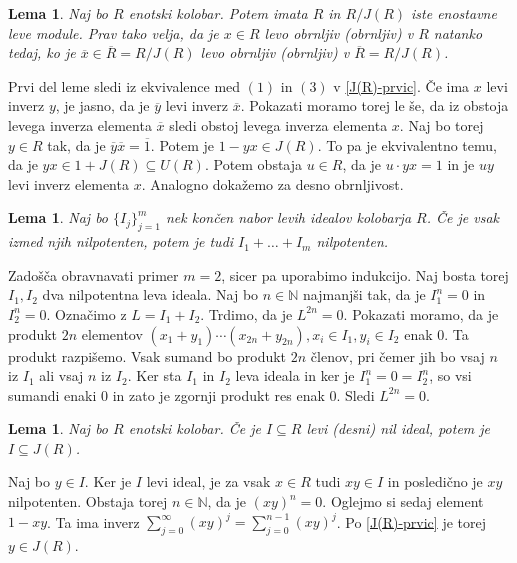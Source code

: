 \documentclass[a4paper, 12pt]{amsart}
\theoremstyle{definition} %
\theoremstyle{plain} %
\newtheorem{lema}[definicija]{Lema}
\newcommand{\N}{\mathbb N}
\begin{document}
\begin{lema}
\label{RinR/J(R)}
Naj bo $R$ enotski kolobar. Potem imata $R$ in $R/J(R)$ iste enostavne leve module. Prav tako velja, da je $x\in R$ levo obrnljiv (obrnljiv) v $R$ natanko tedaj, ko je $\overline{x} \in \overline{R} = R/J(R)$ levo obrnljiv (obrnljiv) v $\overline{R} = R/J(R)$.
\end{lema}

\proof
Prvi del leme sledi iz ekvivalence med $(1)$ in $(3)$ v \ref{J(R)-prvic}. Če ima $x$ levi inverz $y$, je jasno, da je $\overline{y}$ levi inverz $\overline{x}$. Pokazati moramo torej le še, da iz obstoja levega inverza elementa $\overline{x}$ sledi obstoj levega inverza  elementa $x$. Naj bo torej $y\in R$ tak, da je $\overline{y} \overline{x} = \overline{1}$. Potem je $1- yx \in J(R)$. To pa je ekvivalentno temu, da je $yx \in 1 + J(R) \subseteq U(R)$. Potem obstaja  $u\in R$, da je $u\cdot yx =1$ in je $uy $ levi inverz elementa $x$. Analogno dokažemo za desno obrnljivost.
\endproof

\begin{lema}
Naj bo $\{I_j\}_{j=1}^m$ nek končen nabor levih idealov kolobarja $R$. Če je vsak izmed njih nilpotenten, potem je tudi $I_1 + \dots + I_m$ nilpotenten.
\end{lema}

\proof
Zadošča obravnavati primer $m=2$, sicer pa uporabimo indukcijo. Naj bosta torej $I_1,I_2$ dva nilpotentna leva ideala. Naj bo $n\in \N$ najmanjši tak, da je $I_1^n = 0$ in $I_2^n = 0$. Označimo z $L=I_1 + I_2$. Trdimo, da je $L^{2n} = 0$. Pokazati moramo, da je produkt $2n$ elementov $(x_1 + y_1) \cdots (x_{2n} + y_{2n}), x_i \in I_1, y_i \in I_2$  enak 0. Ta produkt razpišemo. Vsak sumand bo produkt $2n$ členov, pri čemer jih bo vsaj $n$ iz $I_1$ ali vsaj $n$ iz $I_2$. Ker sta $I_1$ in $I_2$ leva ideala in ker je $I_1^n = 0 = I_2^n$, so vsi sumandi enaki 0 in zato je zgornji produkt res enak 0. Sledi $L^{2n} = 0$.
\endproof
 
\begin{lema}
\label{nilPodJ(R)}
Naj bo $R$ enotski kolobar. Če je $I\subseteq R$ levi (desni) nil ideal, potem je $I\subseteq J(R)$.
\end{lema}

\proof
Naj bo $y\in I$. Ker je $I$ levi ideal, je za vsak $x\in R$ tudi $xy \in I$ in posledično je $xy$ nilpotenten. Obstaja torej $n\in \N$, da je $(xy)^n = 0$. Oglejmo si sedaj element $1-xy$. Ta ima inverz $\sum_{j=0}^{\infty} (xy)^j = \sum_{j=0}^{n-1} (xy)^j$. Po \ref{J(R)-prvic} je torej $y \in J(R)$.
\endproof
\end{document}
